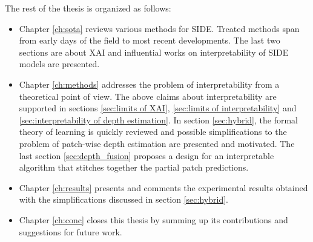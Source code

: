 The rest of the thesis is organized as follows:
\begin{itemize}
    \item{
        Chapter \ref{ch:sota} reviews various methods for SIDE.
        Treated methods span from early days of the field to most recent developments.
        The last two sections are about XAI and influential works on interpretability of SIDE models are presented.
    }
    \item{
        Chapter \ref{ch:methods} addresses the problem of interpretability from a theoretical point of view.
        The above claims about interpretability are supported in sections \ref{sec:limits of XAI}, \ref{sec:limits of interpretability} and \ref{sec:interpretability of depth estimation}.
        In section \ref{sec:hybrid}, the formal theory of learning is quickly reviewed and possible simplifications to the problem of patch-wise depth estimation are presented and motivated.
        The last section \ref{sec:depth_fusion} proposes a design for an interpretable algorithm that stitches together the partial patch predictions.
    }
    \item{
        Chapter \ref{ch:results} presents and comments the experimental results obtained with the simplifications discussed in section \ref{sec:hybrid}.
    }
    \item{
        Chapter \ref{ch:conc} closes this thesis by summing up its contributions and suggestions for future work.
    }
\end{itemize}
%
